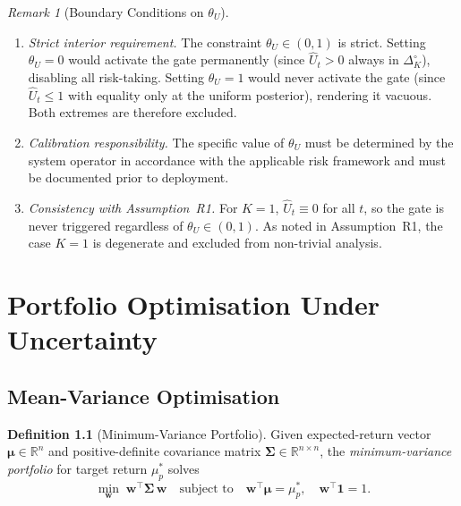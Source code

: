 \documentclass[12pt,openany]{book}
\newcommand{\R}{\mathbb{R}}
\newcommand{\bfw}{\mathbf{w}}
\newcommand{\bfmu}{\boldsymbol{\mu}}
\numberwithin{equation}{chapter}
\theoremstyle{plain}
\theoremstyle{definition}
\newtheorem{definition}[theorem]{Definition}
\theoremstyle{remark}
\newtheorem{remark}[theorem]{Remark}
\numberwithin{equation}{chapter}
\theoremstyle{plain}
\newcommand{\bfSigma}{\boldsymbol{\Sigma}}
\begin{document}
\begin{remark}[Boundary Conditions on $\theta_U$]
\label{rem:theta-boundary}
\begin{enumerate}
  \item \emph{Strict interior requirement.}
        The constraint $\theta_U \in (0,1)$ is strict.
        Setting $\theta_U = 0$ would activate the gate
        permanently (since $\hat{U}_t > 0$ always in
        $\Delta_K^{\circ}$), disabling all risk-taking.
        Setting $\theta_U = 1$ would never activate the
        gate (since $\hat{U}_t \leq 1$ with equality
        only at the uniform posterior), rendering it
        vacuous.  Both extremes are therefore excluded.
  \item \emph{Calibration responsibility.}
        The specific value of $\theta_U$ must be
        determined by the system operator in accordance
        with the applicable risk framework and must be
        documented prior to deployment.
  \item \emph{Consistency with Assumption~R1.}
        For $K = 1$, $\hat{U}_t \equiv 0$ for all $t$,
        so the gate is never triggered regardless of
        $\theta_U \in (0,1)$.  As noted in
        Assumption~R1, the case $K=1$ is degenerate and
        excluded from non-trivial analysis.
\end{enumerate}
\end{remark}

\chapter{Portfolio Optimisation Under Uncertainty}
\label{ch:portfolio}

\section{Mean-Variance Optimisation}

\begin{definition}[Minimum-Variance Portfolio]
\label{def:mv-portfolio}
Given expected-return vector $\bfmu \in \R^n$ and positive-definite
covariance matrix $\bfSigma \in \R^{n \times n}$, the
\emph{minimum-variance portfolio} for target return $\mu_p^*$ solves
\begin{equation}
  \min_{\bfw}\; \bfw^\top \bfSigma\, \bfw
  \quad\text{subject to}\quad
  \bfw^\top \bfmu = \mu_p^*,\quad
  \bfw^\top \mathbf{1} = 1.
  \label{eq:mv-opt}
\end{equation}
\end{definition}
\end{document}
